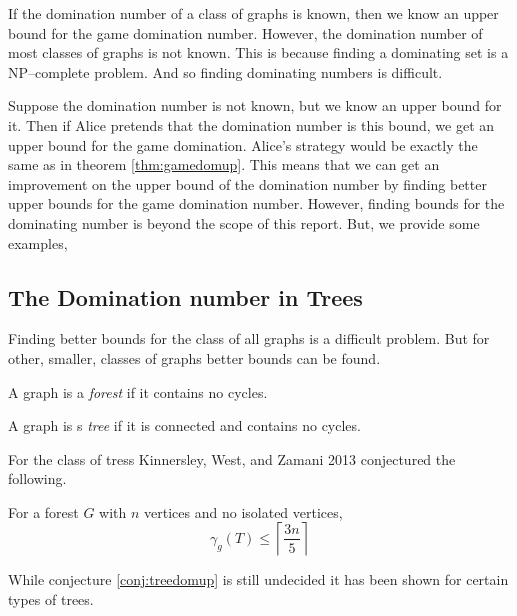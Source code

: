 If the domination number of a class of graphs is known, then we know an upper bound for the game domination number. However, the domination number of most classes of graphs is not known. This is because finding a dominating set is a NP--complete problem. And so finding dominating numbers is difficult.

Suppose the domination number is not known, but we know an upper bound for it. Then if Alice pretends that the domination number is this bound, we get an upper bound for the game domination. Alice's strategy would be exactly the same as in theorem \ref{thm:gamedomup}. This means that we can get an improvement on the upper bound of the domination number by finding  better upper bounds for the game domination number. However, finding bounds for the dominating number is beyond the scope of this report. But, we provide some examples,


\subsection{The Domination number in Trees}
Finding better bounds for the class of all graphs is a difficult problem. But for other, smaller, classes of graphs better bounds can be found. 
\begin{definition}[Forest]
    A graph is a \textit{forest} if it contains no cycles. 
\end{definition}
\begin{definition}[Tree]
    A graph is s \textit{tree} if it is connected and contains no cycles.
\end{definition}
For the class of tress
Kinnersley, West, and Zamani 2013 \cite{KiWeZa2013} conjectured the following. 
\begin{conjecture} \label{conj:treedomup}
    For a forest $G$ with $n$ vertices and no isolated vertices,    
    \[ \gamma_g(T) \leq \left\lceil \frac{3n}{5} \right\rceil\]
\end{conjecture}
While conjecture \ref{conj:treedomup} is still undecided it has been shown for certain types of trees. 

